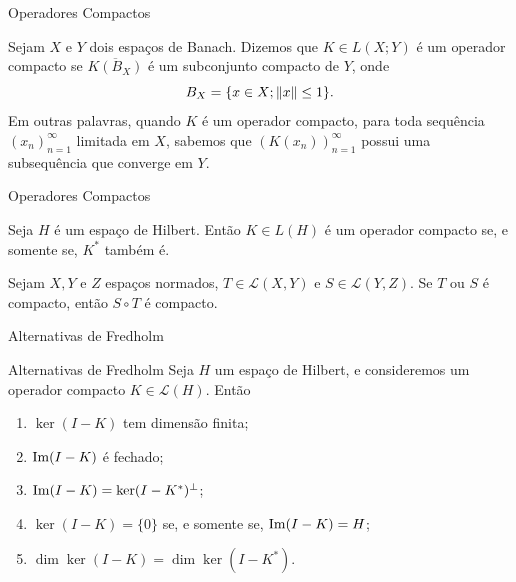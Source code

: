 \begin{frame}{Operadores Compactos}
\begin{defin}
Sejam \(X\) e \(Y\) dois espaços de Banach. Dizemos que \(K\in L(X;Y)\) é um {\color{blue}operador compacto} se \(\overline{K(B_X)}\) é um subconjunto compacto de \(Y\), onde 
\[B_X=\{x\in X; \lVert x\rVert\leq 1\}.\]
Em outras palavras, quando \(K\) é um operador compacto, para toda sequência \((x_n)_{n=1}^\infty\)
limitada em \(X\), sabemos que \( (K(x_n))_{n=1}^\infty \) possui uma subsequência que converge em \(Y\).
 \end{defin}
\end{frame} 
\begin{frame}{Operadores Compactos}
\begin{prop}
Seja \(H\) é um espaço de Hilbert. Então \(K\in L(H)\) é um operador compacto se, e somente se, \(K^\ast\) também é. 
\end{prop}

\begin{prop}
Sejam \(X,Y\) e  \(Z\) espaços normados, \(T\in \mathcal{L}(X,Y)\) e \(S\in \mathcal{L}(Y,Z)\). Se 
\(T\) ou \(S\) é compacto, então \(S\circ T\) é compacto.
\end{prop}
\end{frame}

\begin{frame}{Alternativas de Fredholm}
\begin{block}{Alternativas de Fredholm {\cite[pag. 680]{evans}}}
Seja \(H\) um espaço de Hilbert, e consideremos um operador compacto \(K\in 
\mathcal{L}(H)\). Então
\begin{enumerate}[a]
\item \(\ker(I-K)\) tem dimensão finita;
\item \(\operatorname{Im}(I-K)\) é fechado;
\item \(\operatorname{Im}(I-K)=\ker(I-K^\ast)^\perp\);
\item \(\ker(I-K)=\{0\}\) se, e somente se, \(\operatorname{Im}(I-K)=H\);
\item \(\dim \ker(I-K)=\dim \ker(I-K^\ast)\).
\end{enumerate}
\end{block}
\end{frame}

